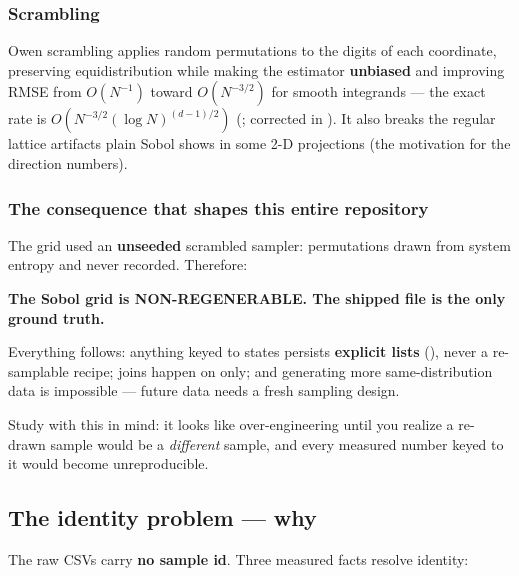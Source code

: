 \subsubsection{Scrambling}
\label{sec:scrambling}

Owen scrambling applies random permutations to the digits of each coordinate,
preserving equidistribution while making the estimator \textbf{unbiased} and
improving RMSE from $O(N^{-1})$ toward $O(N^{-3/2})$ for smooth integrands ---
the exact rate is $O(N^{-3/2}(\log N)^{(d-1)/2})$
(\citealt{owen1997a,owen1997b}; corrected in \citealt{owen2008}). It also breaks
the regular lattice artifacts plain Sobol shows in some 2-D projections (the
motivation for the \citealt{joe2008} direction numbers).

\subsubsection{The consequence that shapes this entire repository}
\label{sec:nonregenerable}

The grid used an \textbf{unseeded} scrambled sampler: permutations drawn from
system entropy and never recorded. Therefore:

\begin{result}
\textbf{The Sobol grid is NON-REGENERABLE. The shipped file is the only ground
truth.}
\end{result}

Everything follows: anything keyed to states persists \textbf{explicit
 lists} (), never a
re-samplable recipe; joins happen on  only; and generating more
same-distribution data is impossible --- future data needs a fresh sampling
design.

Study  with this in mind: it looks like
over-engineering until you realize a re-drawn sample would be a \emph{different}
sample, and every measured number keyed to it would become unreproducible.

\subsection{The identity problem --- why
  \texorpdfstring{}{state\_id}}
\label{sec:stateid}

The raw CSVs carry \textbf{no sample id}. Three measured facts resolve identity:


